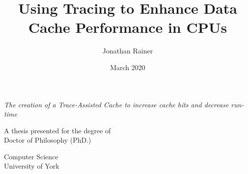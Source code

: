 \title{Using Tracing to Enhance Data Cache Performance in CPUs}
\author{Jonathan Rainer}
\date{March 2020}

\begin{titlepage}
    \begin{center}
        \vspace*{1cm}
 
        \Huge
        \textbf{\thetitle}
 
        \vspace{0.5cm}
        \Large
        \emph{The creation of a Trace-Assisted Cache to increase cache hits and decrease run-time}
 
        \vspace{1.5cm}
 	
 		\LARGE
        \textbf{\theauthor}
 
        \vfill
 
 		\vspace{1cm}
 
        A thesis presented for the degree of\\
        Doctor of Philosophy (PhD.)
        
        \vspace{1cm}
 
        \Large
        Computer Science\\
        University of York\\
        \thedate
 
    \end{center}
\end{titlepage}